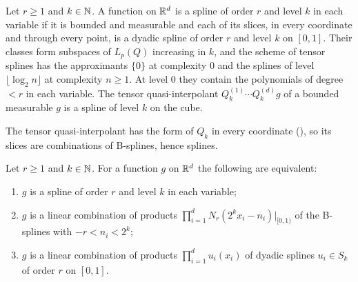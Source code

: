 \begin{definition}
\label{def:cube-spline}
\leanok
{}
Let $r \geq 1$ and $k \in \mathbb{N}$. A function on $\mathbb{R}^d$ is a spline of order $r$ and level $k$ in
each variable if it is bounded and measurable and each of its slices, in every coordinate and
through every point, is a dyadic spline of order $r$ and level $k$ on $[0, 1]$. Their classes form
subspaces of $L_p(Q)$ increasing in $k$, and the scheme of tensor splines has the approximants
$\{0\}$ at complexity $0$ and the splines of level $\lfloor \log_2 n \rfloor$ at complexity
$n \geq 1$. At level $0$ they contain the polynomials of degree $< r$ in each variable. The tensor
quasi-interpolant $Q_k^{(1)} \cdots Q_k^{(d)} g$ of a bounded measurable $g$ is a spline of level
$k$ on the cube.
\end{definition}

The tensor quasi-interpolant has the form of $Q_k$ in every coordinate
(), so its slices are combinations of B-splines, hence splines.

\begin{lemma}
\label{lem:cube-spline-tensor}
\leanok
{}
Let $r \geq 1$ and $k \in \mathbb{N}$. For a function $g$ on $\mathbb{R}^d$ the following are equivalent:
\begin{enumerate}
  \item $g$ is a spline of order $r$ and level $k$ in each variable;
  \item $g$ is a linear combination of products $\prod_{i=1}^d N_r(2^k x_i - n_i)|_{[0,1)}$ of the
    B-splines with $-r < n_i < 2^k$;
  \item $g$ is a linear combination of products $\prod_{i=1}^d u_i(x_i)$ of dyadic splines
    $u_i \in S_k$ of order $r$ on $[0, 1]$.
\end{enumerate}
\end{lemma}

